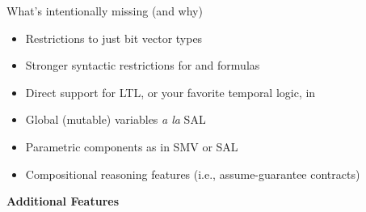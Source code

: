 \documentclass[10pt,aspectratio=149]{beamer}
\begin{document}

\begin{frame}{What's intentionally missing (and why)}
\smallskip

\begin{itemize}
\item
Restrictions to just bit vector types \\[.5ex]
\smallskip

\item
Stronger syntactic restrictions for \inita and \transa formulas \\[.5ex]
\smallskip

\item
Direct support for LTL, or your favorite temporal logic, in \checksys \\[.5ex]
\smallskip

\item
Global (mutable) variables \emph{a la} SAL \\[.5ex]
\smallskip

\item
Parametric components as in SMV or SAL \\[.5ex] 
\smallskip

\item
Compositional reasoning features
(i.e., assume-guarantee contracts) \\[.5ex]
\smallskip

\end{itemize}

\end{frame}


\begin{frame}{}
\LARGE
\centering
\bigskip

\textbf{Additional Features}

\end{frame}
\end{document}

